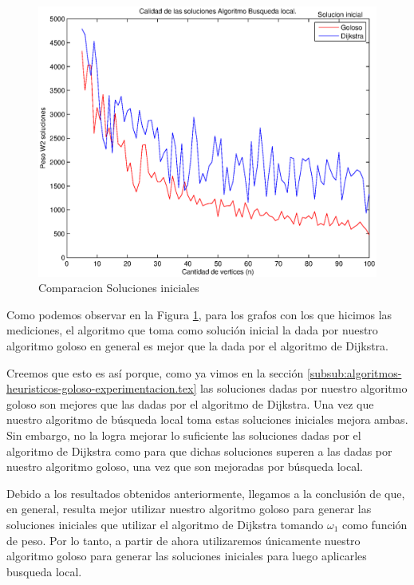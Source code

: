 \begin{figure}[H]
  \begin{center}
    \begin{minipage}{0.5\linewidth}
      \includegraphics[width=\linewidth]{graficos/busq_local_calidad.eps}
      \caption{Comparacion Soluciones iniciales}\label{fig:busq-local-calidad}
    \end{minipage}
  \end{center}
\end{figure}
  
Como podemos observar en la Figura \ref{fig:busq-local-calidad}, para los grafos con los que hicimos las mediciones, el algoritmo que toma como solución inicial la dada por nuestro algoritmo goloso en general es mejor que la dada por el algoritmo de Dijkstra.

Creemos que esto es así porque, como ya vimos en la sección \ref{subsub:algoritmos-heuristicos-goloso-experimentacion.tex} las soluciones dadas por nuestro algoritmo goloso son mejores que las dadas por el algoritmo de Dijkstra. Una vez que nuestro algoritmo de búsqueda local toma estas soluciones iniciales mejora ambas. Sin embargo, no la logra mejorar lo suficiente las soluciones dadas por el algoritmo de Dijkstra como para que dichas soluciones superen a las dadas por nuestro algoritmo goloso, una vez que son mejoradas por búsqueda local.

Debido a los resultados obtenidos anteriormente, llegamos a la conclusión de que, en general, resulta mejor utilizar nuestro algoritmo goloso para generar las soluciones iniciales que utilizar el algoritmo de Dijkstra tomando $\omega_1$ como función de peso. Por lo tanto, a partir de ahora utilizaremos únicamente nuestro algoritmo goloso para generar las soluciones iniciales para luego aplicarles busqueda local.